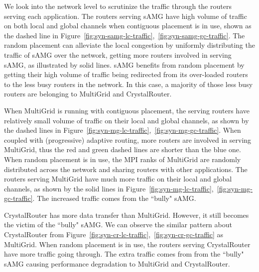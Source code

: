 We look into the network level to scrutinize the traffic through the routers serving each application. 
The routers serving sAMG have high volume of traffic on both local and global channels when contiguous placement is in use, 
shown as the dashed line in Figure~\ref{fig:syn-samg-lc-traffic},~\ref{fig:syn-samg-gc-traffic}.
The random placement can alleviate the local congestion by uniformly distributing the traffic of sAMG over the network, getting more routers involved in serving sAMG, as illustrated by solid lines. 
sAMG benefits from random placement by getting their high volume of traffic being redirected 
from its over-loaded routers to the less busy routers in the network. 
In this case, a majority of those less busy routers are belonging to MultiGrid and CrystalRouter.



When MultiGrid is running with contiguous placement, the serving routers have relatively small volume of traffic on their local and global channels, as shown by the dashed lines in Figure~\ref{fig:syn-mg-lc-traffic},~\ref{fig:syn-mg-gc-traffic}. When coupled with (progressive) adaptive routing, more routers are involved in serving MultiGrid, thus the red and green dashed lines are shorter than the blue one. 
When random placement is in use, the MPI ranks of MultiGrid are randomly distributed across the network and sharing routers with other applications. The routers serving MultiGrid have much more traffic on their local and global channels, as shown by the solid lines in Figure~\ref{fig:syn-mg-lc-traffic},~\ref{fig:syn-mg-gc-traffic}. The increased traffic comes from the ``bully" sAMG. 

CrystalRouter has more data transfer than MultiGrid. However, it still becomes the victim of the ``bully" sAMG. We can observe the similar pattern about CrystalRouter from Figure~\ref{fig:syn-cr-lc-traffic},~\ref{fig:syn-cr-gc-traffic} as MultiGrid. When random placement is in use, the routers serving CrystalRouter have more traffic going through.
The extra traffic comes from from the ``bully" sAMG causing performance degradation to MultiGrid and CrystalRouter. 


